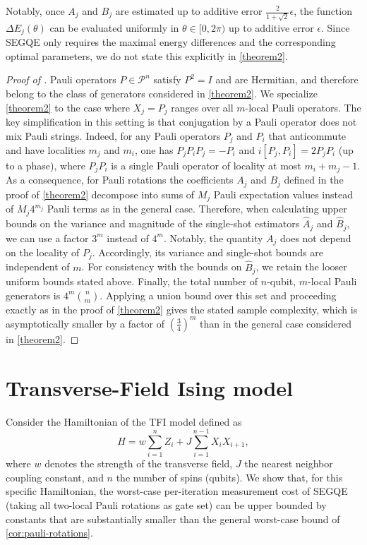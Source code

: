 Notably, once $A_j$ and $B_j$ are estimated up to additive error $\frac{2}{1+\sqrt{2}}\epsilon$, the function $\Delta E_j(\theta)$ can be evaluated uniformly in $\theta\in[0,2\pi)$ up to additive error $\epsilon$. Since SEGQE only requires the maximal energy differences and the corresponding optimal parameters, we do not state this explicitly in \cref{theorem2}. %
\begin{proof}[Proof of ]
Pauli operators $P\in\mathcal P^n$ satisfy $P^2=I$ and are Hermitian, and therefore belong to the class of generators considered in \cref{theorem2}. We specialize \cref{theorem2} to the case where $X_j=P_j$ ranges over all $m$-local Pauli operators. The key simplification in this setting is that conjugation by a Pauli operator does not mix Pauli strings.
Indeed, for any Pauli operators $P_j$ and $P_i$ that anticommute and have localities $m_j$ and $m_i$, one has $P_j P_i P_j = - P_i$ and $i[P_j,P_i] = 2P_jP_i$ (up to a phase), where $P_jP_i$ is a single Pauli operator of locality at most $m_i+m_j-1$. As a consequence, for Pauli rotations the coefficients $A_j$ and $B_j$ defined in the proof of \cref{theorem2} decompose into sums of $M_j$ Pauli expectation values instead of $M_j4^{m_j}$ Pauli terms as in the general case. Therefore, when calculating upper bounds on the variance and magnitude of the single-shot estimators $\hat{A}_j$ and $\hat{B}_j$, we can use a factor $3^m$ instead of $4^m$. Notably, the quantity $A_j$ does not depend on the locality of $P_j$. Accordingly, its variance and single-shot bounds are independent of $m$. For consistency with the bounds on $\hat B_j$, we retain the looser uniform bounds stated above. 
Finally, the total number of $n$-qubit, $m$-local Pauli generators is $4^m\binom{n}{m}$. Applying a union bound over this set and proceeding exactly as in the proof of \cref{theorem2} gives the stated sample complexity, which is asymptotically smaller by a factor of $\left(\frac{3}{4}\right)^m$ than in the general case considered in \cref{theorem2}.
\end{proof}

\section{Transverse-Field Ising model}
\label{app:tfi}
Consider the Hamiltonian of the TFI model defined as
\begin{equation}
    H=w\sum^n_{i=1}Z_i+J\sum^{n-1}_{i=1}X_iX_{i+1},
\end{equation}
where $w$ denotes the strength of the transverse field, $J$ the nearest neighbor coupling constant, and $n$ the number of spins (qubits). We show that, for this specific Hamiltonian, the worst-case per-iteration measurement cost of SEGQE (taking all two-local Pauli rotations as gate set) can be upper bounded by constants that are substantially smaller than the general worst-case bound of \cref{cor:pauli-rotations}.

